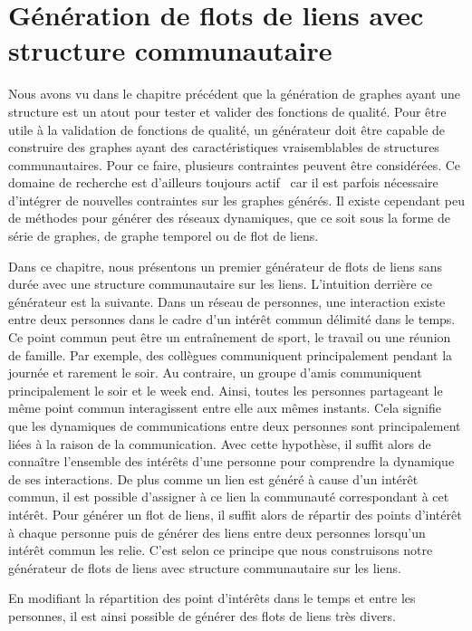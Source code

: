 \chapter{Génération de flots de liens avec structure communautaire}
\minitoc
\label{versQualite}

Nous avons vu dans le chapitre précédent que la génération de graphes ayant une structure est un atout pour tester et valider des fonctions de qualité.
Pour être utile à la validation de fonctions de qualité, un générateur doit être capable de construire des graphes ayant des caractéristiques vraisemblables de structures communautaires.
Pour ce faire, plusieurs contraintes peuvent être considérées.
Ce domaine de recherche est d'ailleurs toujours actif~\cite{Tabourier2011,Obradovic2014} car il est parfois nécessaire d'intégrer de nouvelles contraintes sur les graphes générés.
Il existe cependant peu de méthodes pour générer des réseaux dynamiques, que ce soit sous la forme de série de graphes, de graphe temporel ou de flot de liens.


Dans ce chapitre, nous présentons un premier générateur de flots de liens sans durée avec une structure communautaire sur les liens.
L'intuition derrière ce générateur est la suivante.
Dans un réseau de personnes, une interaction existe entre deux personnes dans le cadre d'un intérêt commun délimité dans le temps.
Ce point commun peut être un entraînement de sport, le travail ou une réunion de famille.
Par exemple, des collègues communiquent principalement pendant la journée et rarement le soir.
Au contraire, un groupe d'amis communiquent principalement le soir et le week end.
Ainsi, toutes les personnes partageant le même point commun interagissent entre elle aux mêmes instants.
Cela signifie que les dynamiques de communications entre deux personnes sont principalement liées à la raison de la communication.
Avec cette hypothèse, il suffit alors de connaître l'ensemble des intérêts d'une personne pour comprendre la dynamique de ses interactions.
De plus comme un lien est généré à cause d'un intérêt commun, il est possible d'assigner à ce lien la communauté correspondant à cet intérêt.
Pour générer un flot de liens, il suffit alors de répartir des points d'intérêt à chaque personne puis de générer des liens entre deux personnes lorsqu'un intérêt commun les relie.
C'est selon ce principe que nous construisons notre générateur de flots de liens avec structure communautaire sur les liens.

En modifiant la répartition des point d'intérêts  dans le temps et entre les personnes, il est ainsi possible de générer des flots de liens très divers.

